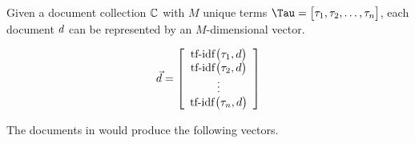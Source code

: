 		\begin{defn}
			Given a document collection $\mathbb{C}$ with $M$ unique terms $\terms = \bigl[\term_1, \term_2, \dotsc, \term_n \bigr]$, each document $d$ can be represented by an $M$-dimensional vector.
			
			\[
				\vec{d} = 
				\left[
				\begin{array}{c}
					\operatorname{tf-idf}\bigl(\tau_1, d\bigr) \\
					\operatorname{tf-idf}\bigl(\tau_2, d\bigr) \\
					\vdots \\
					\operatorname{tf-idf}\bigl(\tau_n, d\bigr)
				\end{array}
				\right]
			\]
		\end{defn}
		
		\begin{ex}
			The documents in  would produce the following vectors.
			

\end{ex}
